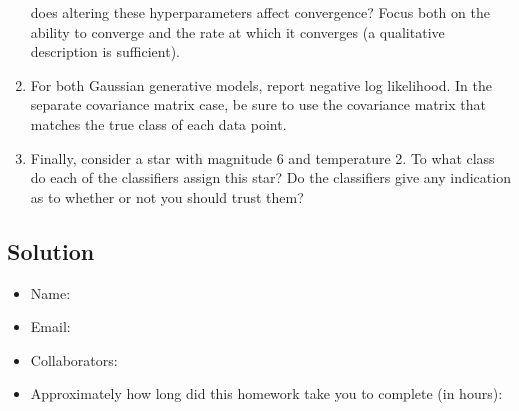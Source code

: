 \documentclass[submit]{harvardml}
\begin{document}
\begin{problem}
\begin{enumerate}
  does altering these hyperparameters affect convergence? Focus both
  on the ability to converge and the rate at which it converges (a
  qualitative description is sufficient).
\item For both Gaussian generative models, report negative log
  likelihood. In the separate covariance matrix case, be sure to use
  the covariance matrix that matches the true class of each data
  point.
\item Finally, consider a star with magnitude 6 and temperature 2.
  To what class do each of the classifiers assign this star?  Do the
  classifiers give any indication as to whether or not you should
  trust them?
\end{enumerate}
\end{problem}
\subsection*{Solution}
\newpage
\begin{itemize}
    \item Name:
    \item Email:
    \item Collaborators:
    \item Approximately how long did this homework take you to complete (in hours):
\end{itemize}
\end{document}
